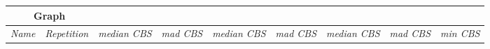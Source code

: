 \documentclass{scrartcl}
\theoremstyle{plain}
\newcommand{\cbs}{CBS}
\begin{document}
\begin{table}[!ht]
	\centering
	\scriptsize
	\begin{tabular}{|lr|rr|rr|rr|r|}
	\hline
\multicolumn{2}{|c|}{\textbf{Graph}}  & 
\multicolumn{2}{c|}{} & \multicolumn{2}{c|}{} &  
\multicolumn{2}{c|}{} & \\ \hline	

\multicolumn{1}{|c}{\emph{Name}} & \multicolumn{1}{c|}{\emph{Repetition}} &
\multicolumn{1}{c}{\emph{median \cbs{}}} & \multicolumn{1}{c|}{\emph{mad 
\cbs{}}} &
\multicolumn{1}{c}{\emph{median \cbs{}}} & \multicolumn{1}{c|}{\emph{mad 
\cbs{}}} &
\multicolumn{1}{c}{\emph{median \cbs{}}} & \multicolumn{1}{c|}{\emph{mad 
\cbs{}}} &
\multicolumn{1}{|c|}{\emph{min \cbs{}}}

\\ \hline


\end{tabular}
\end{table}
\end{document}

